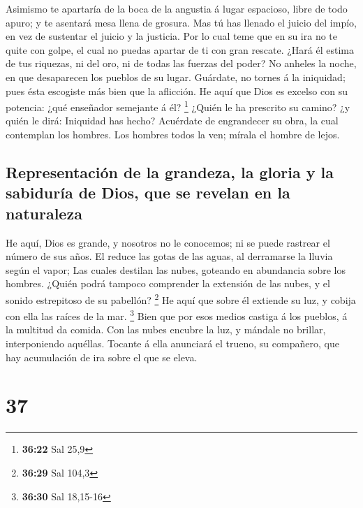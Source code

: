  Asimismo te apartaría de la boca de la angustia á lugar
espacioso, libre de todo apuro; y te asentará mesa llena de grosura.
 Mas tú has llenado el juicio del impío, en vez de
sustentar el juicio y la justicia.  Por lo cual teme que
en su ira no te quite con golpe, el cual no puedas apartar de ti con
gran rescate.  ¿Hará él estima de tus riquezas, ni del
oro, ni de todas las fuerzas del poder?  No anheles la
noche, en que desaparecen los pueblos de su lugar. 
Guárdate, no tornes á la iniquidad; pues ésta escogiste más bien que la
aflicción.  He aquí que Dios es excelso con su potencia:
¿qué enseñador semejante á él? \footnote{\textbf{36:22} Sal 25,9}
 ¿Quién le ha prescrito su camino? ¿y quién le dirá:
Iniquidad has hecho?  Acuérdate de engrandecer su obra,
la cual contemplan los hombres.  Los hombres todos la
ven; mírala el hombre de lejos.

\hypertarget{representaciuxf3n-de-la-grandeza-la-gloria-y-la-sabiduruxeda-de-dios-que-se-revelan-en-la-naturaleza}{%
\subsection{Representación de la grandeza, la gloria y la sabiduría de
Dios, que se revelan en la
naturaleza}\label{representaciuxf3n-de-la-grandeza-la-gloria-y-la-sabiduruxeda-de-dios-que-se-revelan-en-la-naturaleza}}

 He aquí, Dios es grande, y nosotros no le conocemos; ni
se puede rastrear el número de sus años.  El reduce las
gotas de las aguas, al derramarse la lluvia según el vapor;
 Las cuales destilan las nubes, goteando en abundancia
sobre los hombres.  ¿Quién podrá tampoco comprender la
extensión de las nubes, y el sonido estrepitoso de su pabellón?
\footnote{\textbf{36:29} Sal 104,3}  He aquí que sobre él
extiende su luz, y cobija con ella las raíces de la mar. \footnote{\textbf{36:30}
  Sal 18,15-16}  Bien que por esos medios castiga á los
pueblos, á la multitud da comida.  Con las nubes encubre
la luz, y mándale no brillar, interponiendo aquéllas. 
Tocante á ella anunciará el trueno, su compañero, que hay acumulación de
ira sobre el que se eleva.

\hypertarget{section-36}{%
\section{37}\label{section-36}}

